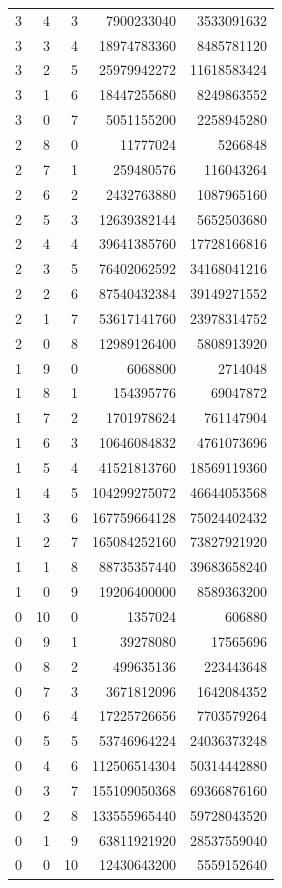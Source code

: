 \begin{longtable}{rrr|rr}
3&4&3&7900233040&3533091632\\
3&3&4&18974783360&8485781120\\
3&2&5&25979942272&11618583424\\
3&1&6&18447255680&8249863552\\
3&0&7&5051155200&2258945280\\
2&8&0&11777024&5266848\\
2&7&1&259480576&116043264\\
2&6&2&2432763880&1087965160\\
2&5&3&12639382144&5652503680\\
2&4&4&39641385760&17728166816\\
2&3&5&76402062592&34168041216\\
2&2&6&87540432384&39149271552\\
2&1&7&53617141760&23978314752\\
2&0&8&12989126400&5808913920\\
1&9&0&6068800&2714048\\
1&8&1&154395776&69047872\\
1&7&2&1701978624&761147904\\
1&6&3&10646084832&4761073696\\
1&5&4&41521813760&18569119360\\
1&4&5&104299275072&46644053568\\
1&3&6&167759664128&75024402432\\
1&2&7&165084252160&73827921920\\
1&1&8&88735357440&39683658240\\
1&0&9&19206400000&8589363200\\
0&10&0&1357024&606880\\
0&9&1&39278080&17565696\\
0&8&2&499635136&223443648\\
0&7&3&3671812096&1642084352\\
0&6&4&17225726656&7703579264\\
0&5&5&53746964224&24036373248\\
0&4&6&112506514304&50314442880\\
0&3&7&155109050368&69366876160\\
0&2&8&133555965440&59728043520\\
0&1&9&63811921920&28537559040\\
0&0&10&12430643200&5559152640\\
\end{longtable}
